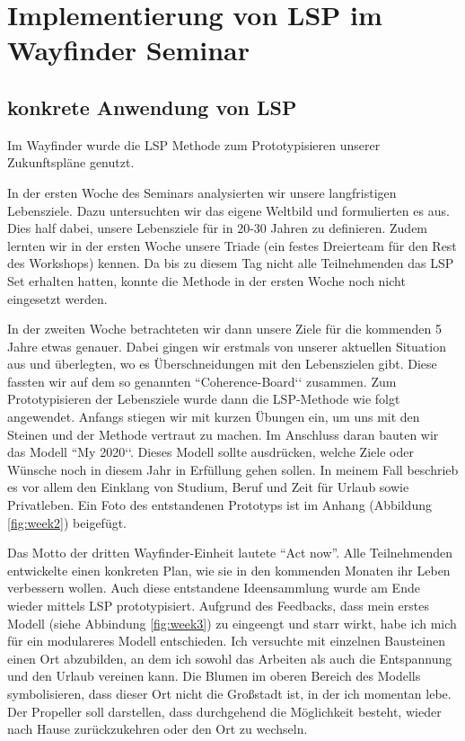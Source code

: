 \section{Implementierung von LSP im Wayfinder Seminar}

\subsection{konkrete Anwendung von LSP}
\label{implementation}

Im Wayfinder wurde die LSP Methode zum Prototypisieren unserer Zukunftspläne genutzt. 

In der ersten Woche des Seminars analysierten wir unsere langfristigen Lebensziele. Dazu untersuchten wir das eigene Weltbild und formulierten es aus. Dies half dabei, unsere Lebensziele für in 20-30 Jahren zu definieren. Zudem lernten wir in der ersten Woche unsere Triade (ein festes Dreierteam für den Rest des Workshops) kennen. Da bis zu diesem Tag nicht alle Teilnehmenden das LSP Set erhalten hatten, konnte die Methode in der ersten Woche noch nicht eingesetzt werden. 

In der zweiten Woche betrachteten wir dann unsere Ziele für die kommenden 5 Jahre etwas genauer. Dabei gingen wir erstmals von unserer aktuellen Situation aus und überlegten, wo es Überschneidungen mit den Lebenszielen gibt. Diese fassten wir auf dem so genannten ``Coherence-Board‘‘ zusammen. Zum Prototypisieren der Lebensziele wurde dann die LSP-Methode wie folgt angewendet. Anfangs stiegen wir mit kurzen Übungen ein, um uns mit den Steinen und der Methode vertraut zu machen. Im Anschluss daran bauten wir das Modell ``My 2020‘‘. Dieses Modell sollte ausdrücken, welche Ziele oder Wünsche noch in diesem Jahr in Erfüllung gehen sollen. In meinem Fall beschrieb es vor allem den Einklang von Studium, Beruf und Zeit für Urlaub sowie Privatleben. Ein Foto des entstandenen Prototyps ist im Anhang (Abbildung \ref{fig:week2}) beigefügt.

Das Motto der dritten Wayfinder-Einheit lautete ``Act now''. Alle Teilnehmenden entwickelte einen konkreten Plan, wie sie in den kommenden Monaten ihr Leben verbessern wollen. Auch diese entstandene Ideensammlung wurde am Ende wieder mittels LSP prototypisiert. Aufgrund des Feedbacks, dass mein erstes Modell (siehe Abbindung \ref{fig:week3}) zu eingeengt und starr wirkt, habe ich mich für ein modulareres Modell entschieden. Ich versuchte mit einzelnen Bausteinen einen Ort abzubilden, an dem ich sowohl das Arbeiten als auch die Entspannung und den Urlaub vereinen kann. Die Blumen im oberen Bereich des Modells symbolisieren, dass dieser Ort nicht die Großstadt ist, in der ich momentan lebe. Der Propeller soll darstellen, dass durchgehend die Möglichkeit besteht, wieder nach Hause zurückzukehren oder den Ort zu wechseln.


